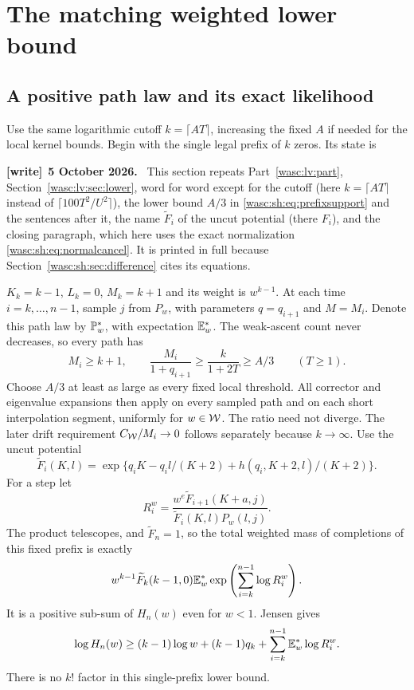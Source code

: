 \documentclass[11pt,a4paper]{article}
\theoremstyle{remark}\newtheorem{remark}[theorem]{Remark}
\numberwithin{equation}{section}
\newenvironment{writenote}[1][]{\par\smallskip\begingroup\small
 \noindent\textbf{[write]}\if\relax\detokenize{#1}\relax\else~\textbf{#1.}\fi\ }%
 {\par\endgroup\smallskip}
\begin{document}
\section{The matching weighted lower bound}\label{wasc:sh:sec:lower}
\subsection{A positive path law and its exact likelihood}
Use the same logarithmic cutoff $k=\lceil AT\rceil$, increasing the fixed $A$ if needed for the local kernel bounds. Begin with the single legal prefix of $k$ zeros. Its state is
\begin{writenote}[5 October 2026]
This section repeats Part~\ref{wasc:lv:part}, Section~\ref{wasc:lv:sec:lower}, word for word except for the cutoff (here $k=\lceil AT\rceil$ instead of $\lceil100T^2/U^2\rceil$), the lower bound $A/3$ in \eqref{wasc:sh:eq:prefixsupport} and the sentences after it, the name $\widetilde F_i$ of the uncut potential (there $F_i$), and the closing paragraph, which here uses the exact normalization \eqref{wasc:sh:eq:normalcancel}. It is printed in full because Section~\ref{wasc:sh:sec:difference} cites its equations.
\end{writenote}
$K_k=k-1$, $L_k=0$, $M_k=k+1$ and its weight is $w^{k-1}$.
At each time $i=k,\ldots,n-1$, sample $j$ from $P_w$, with parameters
$q=q_{i+1}$ and $M=M_i$. Denote this path law by $\mathbb P_w^*$, with expectation $\mathbb E_w^*$.
The weak-ascent count never decreases, so every path has
\begin{equation}\label{wasc:sh:eq:prefixsupport}
M_i\ge k+1,\qquad \frac{M_i}{1+q_{i+1}}\ge\frac{k}{1+2T}\ge A/3\qquad(T\ge1).
\end{equation}
Choose $A/3$ at least as large as every fixed local threshold. All corrector and eigenvalue expansions then apply on every sampled path and on each short interpolation segment, uniformly for $w\in\mathcal W$. The ratio need not diverge. The later drift requirement $C_{\mathcal W}/M_i\to0$ follows separately because $k\to\infty$.
Use the uncut potential
\[
\widetilde F_i(K,l)=\exp\{q_iK-q_i l/(K+2)+h(q_i,K+2,l)/(K+2)\}.
\]
For a step let
\begin{equation}\label{wasc:sh:eq:likelihoodratio}
R_i^w=\frac{w^e\widetilde F_{i+1}(K+a,j)}{\widetilde F_i(K,l)P_w(l,j)}.
\end{equation}
The product telescopes, and $\widetilde F_n=1$, so the total weighted mass of completions of this fixed prefix is exactly
\[
w^{k-1}\widetilde F_k(k-1,0)\mathbb E_w^*\exp\left(\sum_{i=k}^{n-1}\log R_i^w\right).
\]
It is a positive sub-sum of $H_n(w)$ even for $w<1$. Jensen gives
\begin{equation}\label{wasc:sh:eq:jensen}
\log H_n(w)\ge(k-1)\log w+(k-1)q_k+
\sum_{i=k}^{n-1}\mathbb E_w^*\log R_i^w.
\end{equation}
There is no $k!$ factor in this single-prefix lower bound.
\end{document}
